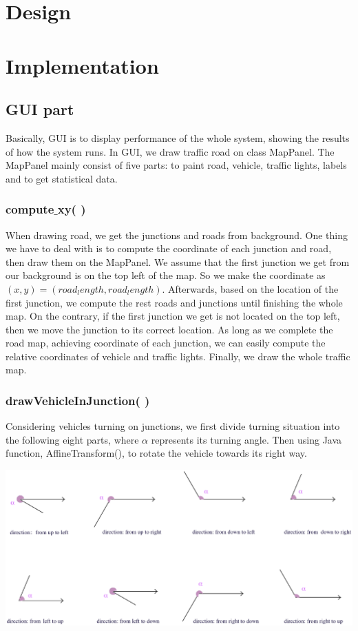 \documentclass[a4paper,12pt]{article}
\begin{document}
\section{Design}

\section{Implementation}

\subsection{GUI part}

Basically, GUI is to display performance of the whole system, showing the results of how the system runs. In GUI, we draw traffic road on class MapPanel. The MapPanel mainly consist of five parts: to paint road, vehicle, traffic lights, labels and to get statistical data.

\subsubsection{compute$\_$xy( )}
When drawing road, we get the junctions and roads from background. One thing we have to deal with is to compute the coordinate of each junction and road, then draw them on the MapPanel. We assume that the first junction we get from our background is on the top left of the map. So we make the coordinate as $(x,y)=(road_length, road_length)$. Afterwards, based on the location of the first junction, we compute the rest roads and junctions until finishing the whole map. On the contrary, if the first junction we get is not located on the top left, then we move the junction to its correct location. As long as we complete the road map, achieving coordinate of each junction, we can easily compute the relative coordinates of vehicle and traffic lights. Finally, we draw the whole traffic map.

\subsubsection{drawVehicleInJunction( )}
Considering vehicles turning on junctions, we first divide turning situation into the following eight parts, where $\alpha$ represents its turning angle. Then using Java function, AffineTransform(), to rotate the vehicle towards its right way.
\begin{center}
	\includegraphics[width=14cm]{GUI_p1.eps}
\end{center}
\end{document}
